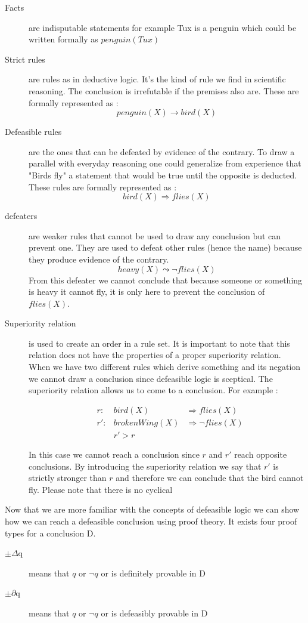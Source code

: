 \documentclass[10pt]{report}
\begin{document}
\begin{description}
\item[Facts] are indisputable statements for example Tux is a penguin which could be written formally as $penguin(Tux)$
\item[Strict rules] are rules as in deductive logic. It's the kind of rule we find in scientific reasoning. The conclusion is irrefutable if the premises also are. These are formally represented as : 
$$penguin(X) \rightarrow bird(X)$$
\item[Defeasible rules] are the ones that can be defeated by evidence of the contrary. To draw a parallel with everyday reasoning one could generalize from experience that "Birds fly" a statement that would be true until the opposite is deducted. These rules are formally represented as :
$$bird(X) \Rightarrow flies(X)$$
\item[defeaters] are weaker rules that cannot be used to draw any conclusion but can prevent one. They are used to defeat other rules (hence the name) because they produce evidence of the contrary. 
$$heavy(X) \leadsto \neg flies(X)$$
From this defeater we cannot conclude that because someone or something is heavy it cannot fly, it is only here to prevent the conclusion of $flies(X)$.
\item[Superiority relation] is used to create an order in a rule set. It is important to note that this relation does not have the properties of a proper superiority relation. When we have two different rules which derive something and its negation we cannot draw a conclusion since defeasible logic is sceptical. The superiority relation allows us to come to a conclusion. For example :

\[
\begin{aligned}
& r :&      bird(X) &\Rightarrow flies(X)\\
& r':&brokenWing(X) &\Rightarrow \neg flies(X)\\
& & r'>r
\end{aligned}
\]

In this case we cannot reach a conclusion since $r$ and $r'$ reach opposite conclusions. By introducing the superiority relation we say that $r'$ is strictly stronger than $r$ and therefore we can conclude that the bird cannot fly. Please note that there is no cyclical 
\end{description}

Now that we are more familiar with the concepts of defeasible logic we can show how we can reach a defeasible conclusion using proof theory. It exists four proof types for a conclusion D.
\begin{description}
\item[$\pm\Delta$q] means that $q$ or $\neg q$ or is definitely provable in D
\item[$\pm\partial$q] means that $q$ or $\neg q$ or is defeasibly provable in D
\end{description}
\end{document}
